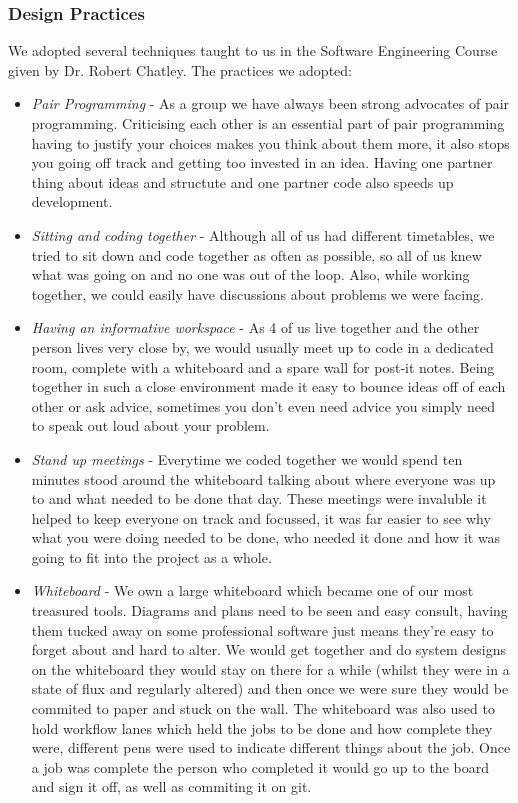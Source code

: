 \documentclass[11pt]{article}
\begin{document}
\subsubsection{Design Practices}
We adopted several techniques taught to us in the Software Engineering Course
given by Dr. Robert Chatley.
The practices we adopted:
\begin{itemize}
\item 
\emph{Pair Programming} - As a group we have always been strong advocates of pair
		 programming. Criticising each other is an essential part of pair programming
		 having to justify your choices makes you think about them more, it also 
		 stops you going off track and getting too invested in an idea. Having
		 one partner thing about ideas and structute and one partner code also speeds
		 up development.
\item 
\emph{Sitting and coding together} - Although all of us had different timetables,
			we tried to sit down and code together as often as possible, so all
			of us knew what was going on and no one was out of the loop. Also, while
			working together, we could easily have discussions about problems we
			were facing.
\item 
\emph{Having an informative workspace} - As 4 of us live together and the other
			person lives very close by, we would usually meet up to code in a 
			dedicated room, complete with a whiteboard and a spare wall for post-it
			notes. Being together in such a close environment made it easy to bounce
			ideas off of each other or ask advice, sometimes you don't even need advice
			you simply need to speak out loud about your problem.

\item 
\emph{Stand up meetings} - Everytime we coded together we would spend ten minutes
			stood around the whiteboard talking about where everyone was up to and what needed to
			be done that day. These meetings were invaluble it helped to keep everyone on track and
			focussed, it was far easier to see why what you were doing needed to be done, who needed it done 
			and how it was going to fit into the project as a whole.

\item
\emph{Whiteboard} - We own a large whiteboard which became one of our most treasured tools. Diagrams and plans 
					need to be seen and easy consult, having them tucked away on some professional software
					just means they're easy to forget about and hard to alter. We would get together and do
					system designs on the whiteboard they would stay on there for a while (whilst they were in a state of
					flux and regularly altered) and then once we were sure they would be commited to paper and stuck on the wall.
					The whiteboard was also used to hold workflow lanes which held the jobs to be done and how complete they were, 
					different pens were used to indicate different things about the job. Once a job was complete the person who
					completed it would go up to the board and sign it off, as well as commiting it on git.  		
			
\end{itemize}
\end{document}
